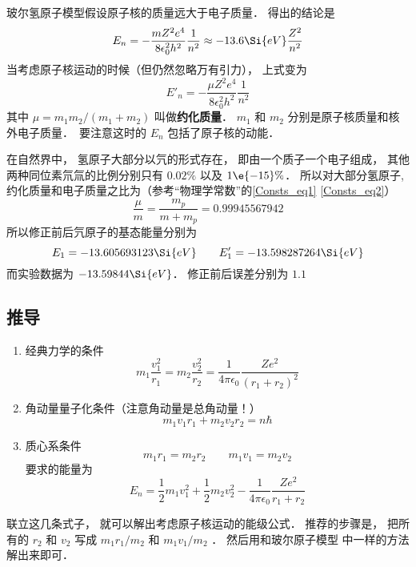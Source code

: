 
玻尔氢原子模型假设原子核的质量远大于电子质量． 得出的结论是
\begin{equation}
E_n = -\frac{mZ^2 e^4}{8\epsilon_0^2 h^2}\frac{1}{n^2} \approx  - 13.6\Si{eV} \frac{Z^2}{n^2}
\end{equation}
当考虑原子核运动的时候（但仍然忽略万有引力）， 上式变为
\begin{equation}\label{HRMass_eq1}
E'_n = -\frac{\mu Z^2 e^4}{8\epsilon_0^2 h^2} \frac{1}{n^2}
\end{equation}
其中 $\mu  = m_1 m_2/(m_1 + m_2)$ 叫做\textbf{约化质量}． $m_1$ 和 $m_2$ 分别是原子核质量和核外电子质量．　要注意这时的 $E_n$ 包括了原子核的动能．

在自然界中， 氢原子大部分以氕的形式存在， 即由一个质子一个电子组成， 其他两种同位素氘氚的比例分别只有 $0.02\%$ 以及 $1\e{-15}\%$． 所以对大部分氢原子, 约化质量和电子质量之比为（参考“物理学常数”的\autoref{Consts_eq1} \autoref{Consts_eq2}）
\begin{equation}
\frac{\mu}{m} = \frac{m_p}{m + m_p} = 0.99945567942
\end{equation}
所以修正前后氕原子的基态能量分别为
\begin{equation}
E_1 = -13.605693123\Si{eV} \qquad 
E'_1 = -13.598287264\Si{eV}
\end{equation}
而实验数据为 $-13.59844\Si{eV}$． 修正前后误差分别为 $1.1$

\subsection{推导}
\begin{enumerate}
\item 经典力学的条件
\begin{equation}
m_1 \frac{v_1^2}{r_1} = m_2 \frac{v_2^2}{r_2} = \frac{1}{4\pi\epsilon_0} \frac{Z e^2}{(r_1 + r_2)^2}
\end{equation}
\item 角动量量子化条件（注意角动量是总角动量！）
\begin{equation}
m_1 v_1 r_1 + m_2 v_2 r_2 = n\hbar 
\end{equation}
\item 质心系条件
\begin{equation}
m_1 r_1 = m_2 r_2 \qquad m_1 v_1 = m_2 v_2
\end{equation}
要求的能量为
\begin{equation}
E_n = \frac12 m_1 v_1^2 + \frac12 m_2 v_2^2 - \frac{1}{4\pi\epsilon_0} \frac{Z e^2}{r_1 + r_2}
\end{equation}
\end{enumerate}
联立这几条式子， 就可以解出考虑原子核运动的能级公式． 推荐的步骤是， 把所有的 $r_2$ 和 $v_2$ 写成 $m_1 r_1/m_2$ 和 $m_1 v_1/m_2$ ． 然后用和玻尔原子模型%
中一样的方法解出来即可．
